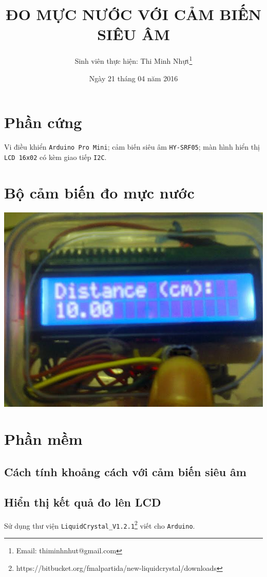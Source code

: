 \documentclass[13pt,a4paper]{extarticle}
\begin{document}
\title{\textbf{ĐO MỰC NƯỚC VỚI CẢM BIẾN SIÊU ÂM}}
\author{Sinh viên thực hiện: Thi Minh Nhựt\thanks{\textsf{Email: thiminhnhut@gmail.com}}}
\date{Ngày 21 tháng 04 năm 2016}
\maketitle
\section{Phần cứng}
Vi điều khiển \verb|Arduino Pro Mini|; cảm biến siêu âm \verb|HY-SRF05|; màn hình hiển thị \verb|LCD 16x02| có kèm giao tiếp \verb|I2C|.
\section{Bộ cảm biến đo mực nước}
\begin{center}
\includegraphics[scale=.3]{do-muc-nuoc-voi-cam-bien-sieu-am}
\end{center}
\section{Phần mềm}
\subsection{Cách tính khoảng cách với cảm biến siêu âm}

\subsection{Hiển thị kết quả đo lên LCD}
Sử dụng thư viện \verb|LiquidCrystal_V1.2.1|\footnote{\textsf{https://bitbucket.org/fmalpartida/new-liquidcrystal/downloads}} viết cho \verb|Arduino|.
\end{document}
